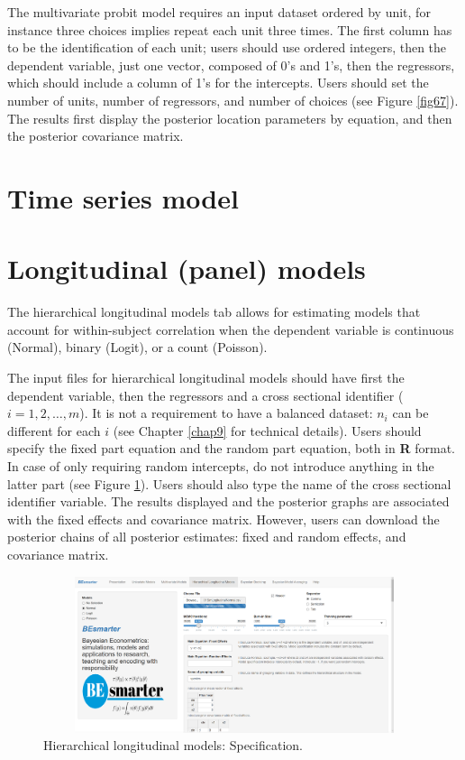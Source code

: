 The multivariate probit model requires an input dataset ordered by unit, for instance three choices implies repeat each unit three times. The first column has to be the identification of each unit; users should use ordered integers, then the dependent variable, just one vector, composed of 0's and 1's, then the regressors, which should include a column of 1's for the intercepts. Users should set the number of units, number of regressors, and number of choices (see Figure \ref{fig67}). The results first display the posterior location parameters by equation, and then the posterior covariance matrix.

\section{Time series model}\label{secGUI4}

\section{Longitudinal (panel) models}\label{secGUI5}
The hierarchical longitudinal models tab allows for estimating models that account for within-subject correlation when the dependent variable is continuous (Normal), binary (Logit), or a count (Poisson).

The input files for hierarchical longitudinal models should have first the dependent variable, then the regressors and a cross sectional identifier ($i=1,2,\dots,m$). It is not a requirement to have a balanced dataset: $n_i$ can be different for each $i$ (see Chapter \ref{chap9} for technical details). Users should specify the fixed part equation and the random part equation,
both in \textbf{R} format. In case of only requiring random intercepts, do not introduce anything in the latter part (see Figure \ref{fig68}). Users should also type the name of the cross sectional identifier variable. The results displayed and the posterior graphs are associated with the fixed effects and covariance matrix. However, users can download the posterior chains of all posterior estimates: fixed and random effects, and covariance matrix.

\begin{figure}
	\includegraphics[width=340pt, height=130pt]{Chapters/chapterGUI/figures/Figure8.png}
	\caption[List of figure caption goes here]{Hierarchical longitudinal models: Specification.}\label{fig68}
\end{figure} 

